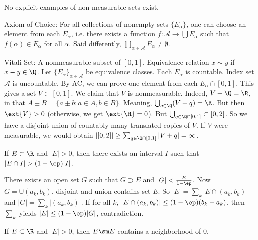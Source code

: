 No explicit examples of non-measurable sets exist. 


Axiom of Choice: For all collections of nonempty sets $\{E_\alpha\}$, one can choose an element from each $E_\alpha$, i.e. there exists a function $f: \mathcal{A} \to \bigcup E_\alpha$ such that $f(\alpha) \in E_\alpha$ for all $\alpha$. Said differently, $\prod_{\alpha \in \mathcal{A}} E_\alpha \neq \emptyset$. 



Vitali Set: A nonmeasurable subset of $[0,1]$. Equivalence relation $x \sim y$ if $x-y \in \Q$. Let $\{E_\alpha\}_{\alpha \in \mathcal{A}}$ be equivalence classes. Each $E_\alpha$ is countable. Index set $\mathcal{A}$ is uncountable. By AC, we can prove one element from each $E_\alpha \cap [0,1]$. This gives a set $V \subset [0,1]$. We claim that $V$ is nonmeasurable. Indeed, $V+\Q=\R$, in that $A \pm B =\{ a \pm b \colon a \in A, b \in B\}$. Meaning, $\bigcup_{q \in \Q} (V+q)=\R$. But then $\ext{V}>0$ (otherwise, we get $\ext{\R}=0$). But $\bigcup_{q \in \Q \cap [0,1]} \subset [0,2]$. So we have a disjoint union of countably many translated copies of $V$. If $V$ were measurable, we would obtain $|[0,2]| \geq \sum_{q \in \Q \cap [0,1]} |V+q|= \infty$. 



\begin{lem} \label{lem:density}
If $E \subset \R$ and $|E|>0$, then there exists an interval $I$ such that $|E \cap I|> (1-\ep) |I|$. 
\end{lem}

\pf There exists an open set $G$ such that $G \supset E$ and $|G|< \frac{|E|}{1-\ep}$. Now $G= \cup (a_k,b_k)$, disjoint and union contains set $E$. So $|E|= \sum_k |E \cap (a_k,b_k)$ and $|G|= \sum_k |(a_k,b_k)|$. If for all $k$, $| E \cap (a_k,b_k)| \leq (1- \ep)(b_k-a_k)$, then $\sum_k$ yields $|E| \leq (1-\ep)|G|$, contradiction. 



\begin{lem} \label{lem:subzero}
If $E \subset \R$ and $|E|>0$, then $E \sm E$ contains a neighborhood of 0. 
\end{lem}



